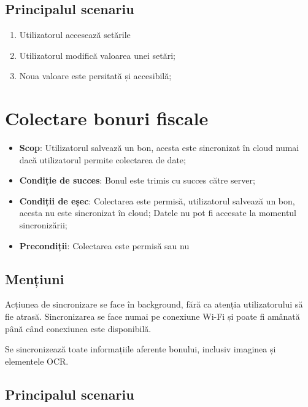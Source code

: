 \subsection{Principalul scenariu}\label{principalul-scenariu-2}

\begin{enumerate}
\item
  Utilizatorul accesează setările
\item
  Utilizatorul modifică valoarea unei setări;
\item
  Noua valoare este persitată și accesibilă;
\end{enumerate}

\section{Colectare bonuri fiscale}\label{colectare-bonuri-fiscale}

\begin{itemize}
\item
  \textbf{Scop}: Utilizatorul salvează un bon, acesta este sincronizat în cloud numai dacă utilizatorul permite colectarea de date;
\item
  \textbf{Condiție de succes}: Bonul este trimis cu succes către server;
\item
  \textbf{Condiții de eșec}: Colectarea este permisă, utilizatorul salvează un bon, acesta nu este sincronizat în cloud; Datele nu pot fi accesate la momentul sincronizării;
\item
  \textbf{Precondiții}: Colectarea este permisă sau nu
\end{itemize}

\subsection{Mențiuni}\label{menux21biuni-2}

Acțiunea de sincronizare se face în background, fără ca atenția utilizatorului să fie atrasă. Sincronizarea se face numai pe conexiune Wi-Fi și poate fi amânată până când conexiunea este disponibilă.

Se sincronizează toate informațiile aferente bonului, inclusiv imaginea și elementele OCR.

\subsection{Principalul scenariu}\label{principalul-scenariu-3}

